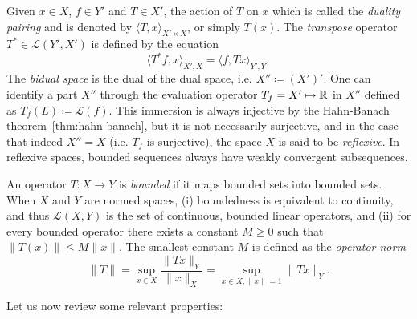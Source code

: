 \begin{definition}
    Given $x\in X$, $f\in Y'$ and $T\in X'$, the action of $T$ on $x$ which is called the \emph{duality pairing} and is denoted by $\langle T, x\rangle_{X'\times X}$, or simply $T(x)$. The \emph{transpose} operator $T^*\in \mathcal{L}(Y',X')$ is defined by the equation 
    \begin{equation}
        \langle T^* f, x\rangle_{X',X} = \langle f, Tx\rangle_{Y',Y},
    \end{equation}
    The \emph{bidual space} is the dual of the dual space, i.e. $X'' \coloneqq (X')'$. One can identify a part $X''$ through the evaluation operator $T_f = X'\mapsto \mathbb{R}$ in $X''$ defined as $T_f(L) \coloneqq \mathcal{L}(f)$. This immersion is always injective by the Hahn-Banach theorem~\ref{thm:hahn-banach}, but it is not necessarily surjective, and in the case that indeed $X''=X$ (i.e. $T_f$ is surjective), the space $X$ is said to be \emph{reflexive}. In reflexive spaces, bounded sequences always have weakly convergent subsequences. %
\end{definition}
\begin{definition}\label{def:bounded-operator}
    An operator $T:X\to Y$ is \emph{bounded} if it maps bounded sets into bounded sets. When $X$ and $Y$ are normed spaces, (i) boundedness is equivalent to continuity, and thus $\mathcal{L}(X,Y)$ is the set of continuous, bounded linear operators, and (ii) for every bounded operator there exists a constant $M\geq 0$ such that $\|T(x)\|\leq M\|x\|$. The smallest constant $M$ is defined as the \emph{operator norm}
    \begin{equation}\label{eq:operator-norm}
        \| T\| =  \sup_{x\in X}\frac{\|Tx\|_Y}{\|x\|_X} = \sup_{x\in X,\|x\|=1}\|Tx\|_Y.
    \end{equation}
\end{definition}
Let us now review some relevant properties: 
